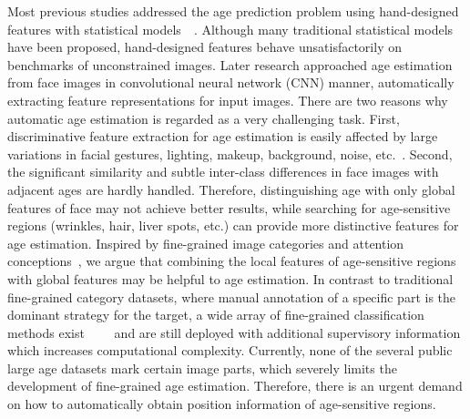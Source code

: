 \documentclass[journal]{IEEEtran}
\begin{document}
Most previous studies addressed the age prediction problem using hand-designed features with statistical models~\cite{ref-a}~\cite{ref-b}. Although many traditional statistical models~\cite{ref-c} have been proposed, hand-designed features behave unsatisfactorily on benchmarks of unconstrained images. Later research approached age estimation from face images in convolutional neural network (CNN) manner, automatically extracting feature representations for input images. There are two reasons  why automatic age estimation is regarded as a very challenging task. First, discriminative feature extraction for age estimation is easily affected by large variations in facial gestures, lighting, makeup, background, noise, etc.~\cite{ref-1}. Second, the significant similarity and subtle inter-class differences in face images with adjacent ages are hardly handled. Therefore, distinguishing age with only global features of face may not achieve better results, while searching for age-sensitive regions (wrinkles, hair, liver spots, etc.) can provide more distinctive features for age estimation. Inspired by fine-grained image categories and attention conceptions~\cite{ref-d}, we argue that combining the local features of age-sensitive regions with global features may be helpful to age estimation. In contrast to traditional fine-grained category datasets, where manual annotation of a specific part is the dominant strategy for the target, a wide array of fine-grained classification methods exist~\cite{ref-2}~\cite{ref-3}~\cite{ref-4}~\cite{ref-5} and are still deployed with additional supervisory information which increases computational complexity. Currently, none of the several public large age datasets mark certain image parts, which severely limits the development of fine-grained age estimation. Therefore, there is an urgent demand on how to automatically obtain position information of age-sensitive regions.
\end{document}
